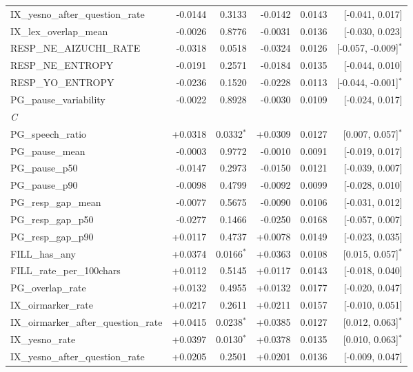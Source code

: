 \begin{longtable}{lrrrrr}
\quad IX\_yesno\_after\_question\_rate & -0.0144 & 0.3133 & -0.0142 & 0.0143 & [-0.041, 0.017] \\
\quad IX\_lex\_overlap\_mean & -0.0026 & 0.8776 & -0.0031 & 0.0136 & [-0.030, 0.023] \\
\quad RESP\_NE\_AIZUCHI\_RATE & -0.0318 & 0.0518 & -0.0324 & 0.0126 & [-0.057, -0.009]$^{*}$ \\
\quad RESP\_NE\_ENTROPY & -0.0191 & 0.2571 & -0.0184 & 0.0135 & [-0.044, 0.010] \\
\quad RESP\_YO\_ENTROPY & -0.0236 & 0.1520 & -0.0228 & 0.0113 & [-0.044, -0.001]$^{*}$ \\
\quad PG\_pause\_variability & -0.0022 & 0.8928 & -0.0030 & 0.0109 & [-0.024, 0.017] \\
\midrule
\multicolumn{6}{l}{\textit{C}} \\
\quad PG\_speech\_ratio & +0.0318 & 0.0332$^{*}$ & +0.0309 & 0.0127 & [0.007, 0.057]$^{*}$ \\
\quad PG\_pause\_mean & -0.0003 & 0.9772 & -0.0010 & 0.0091 & [-0.019, 0.017] \\
\quad PG\_pause\_p50 & -0.0147 & 0.2973 & -0.0150 & 0.0121 & [-0.039, 0.007] \\
\quad PG\_pause\_p90 & -0.0098 & 0.4799 & -0.0092 & 0.0099 & [-0.028, 0.010] \\
\quad PG\_resp\_gap\_mean & -0.0077 & 0.5675 & -0.0090 & 0.0106 & [-0.031, 0.012] \\
\quad PG\_resp\_gap\_p50 & -0.0277 & 0.1466 & -0.0250 & 0.0168 & [-0.057, 0.007] \\
\quad PG\_resp\_gap\_p90 & +0.0117 & 0.4737 & +0.0078 & 0.0149 & [-0.023, 0.035] \\
\quad FILL\_has\_any & +0.0374 & 0.0166$^{*}$ & +0.0363 & 0.0108 & [0.015, 0.057]$^{*}$ \\
\quad FILL\_rate\_per\_100chars & +0.0112 & 0.5145 & +0.0117 & 0.0143 & [-0.018, 0.040] \\
\quad PG\_overlap\_rate & +0.0132 & 0.4955 & +0.0132 & 0.0177 & [-0.020, 0.047] \\
\quad IX\_oirmarker\_rate & +0.0217 & 0.2611 & +0.0211 & 0.0157 & [-0.010, 0.051] \\
\quad IX\_oirmarker\_after\_question\_rate & +0.0415 & 0.0238$^{*}$ & +0.0385 & 0.0127 & [0.012, 0.063]$^{*}$ \\
\quad IX\_yesno\_rate & +0.0397 & 0.0130$^{*}$ & +0.0378 & 0.0135 & [0.010, 0.063]$^{*}$ \\
\quad IX\_yesno\_after\_question\_rate & +0.0205 & 0.2501 & +0.0201 & 0.0136 & [-0.009, 0.047] \\

\end{longtable}
